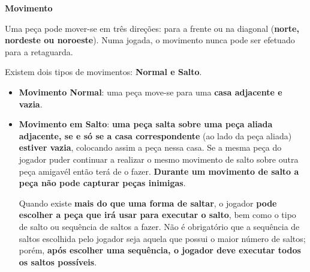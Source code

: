 \documentclass[a4paper]{article}
\begin{document}
\large{\textbf{Movimento}}
\begin{small}

Uma peça pode mover-se em três direções: para a frente ou na diagonal (\textbf{norte, nordeste ou noroeste}). Numa jogada, o movimento nunca pode ser efetuado para a retaguarda. 

Existem dois tipos de movimentos: \textbf{Normal e Salto}. 
\begin{itemize}
\item \textbf{Movimento Normal}:
uma peça move-se para uma \textbf{casa adjacente e vazia}. 
\item \textbf{Movimento em Salto}:
\textbf{uma peça salta sobre uma peça aliada adjacente, se e só se a casa correspondente} (ao lado da peça aliada) \textbf{estiver vazia}, colocando assim a peça nessa casa. Se a mesma peça do jogador puder continuar a realizar o mesmo movimento de salto sobre outra peça amigavél então terá de o fazer. \textbf{Durante um movimento de salto a peça não pode capturar peças inimigas}.

Quando existe \textbf{mais do que uma forma de saltar}, o jogador \textbf{pode escolher a peça que irá usar para executar o salto}, bem como o tipo de salto ou sequência de saltos a fazer. Não é obrigatório que a sequência de saltos escolhida pelo jogador seja aquela que possui o maior número de saltos; porém, \textbf{após escolher uma sequência, o jogador deve executar todos os saltos possíveis}.
\end{itemize}
\end{small}\pagebreak
\end{document}
